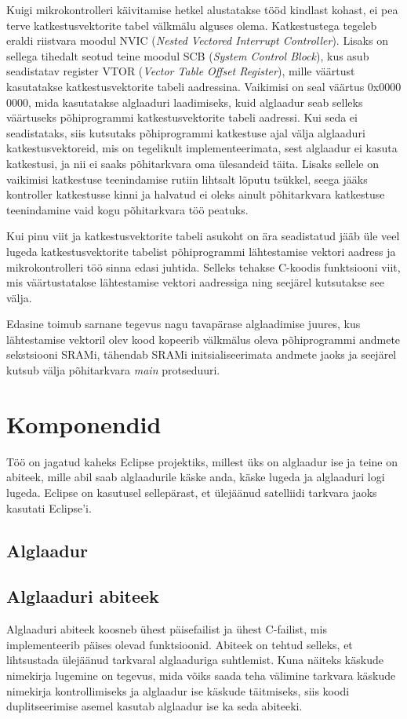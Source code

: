 \documentclass[12pt,a4paper]{article}
\begin{document}
Kuigi mikrokontrolleri käivitamise hetkel alustatakse tööd kindlast kohast, ei
pea terve katkestusvektorite tabel välkmälu alguses olema. Katkestustega tegeleb
eraldi riistvara moodul NVIC (\textit{Nested Vectored Interrupt Controller}).
Lisaks on sellega tihedalt seotud teine moodul SCB (\textit{System Control
Block}), kus asub seadistatav register VTOR (\textit{Vector Table Offset
Register}), mille väärtust kasutatakse katkestusvektorite tabeli aadressina.
\cite[ptk~4.4]{CM3pm} Vaikimisi on seal väärtus 0x0000 0000, mida kasutatakse alglaaduri
laadimiseks, kuid alglaadur seab selleks väärtuseks põhiprogrammi
katkestusvektorite tabeli aadressi. Kui seda ei seadistataks, siis kutsutaks
põhiprogrammi katkestuse ajal välja alglaaduri katkestusvektoreid, mis on
tegelikult implementeerimata, sest alglaadur ei kasuta katkestusi, ja nii ei
saaks põhitarkvara oma ülesandeid täita. Lisaks sellele on vaikimisi katkestuse
teenindamise rutiin lihtsalt lõputu tsükkel, seega jääks kontroller katkestusse
kinni ja halvatud ei oleks ainult põhitarkvara katkestuse teenindamine vaid kogu
põhitarkvara töö peatuks.

Kui pinu viit ja katkestusvektorite tabeli asukoht on ära seadistatud jääb üle
veel lugeda katkestusvektorite tabelist põhiprogrammi lähtestamise vektori
aadress ja mikrokontrolleri töö sinna edasi juhtida. Selleks tehakse C-koodis
funktsiooni viit, mis väärtustatakse lähtestamise vektori aadressiga ning
seejärel kutsutakse see välja.

Edasine toimub sarnane tegevus nagu tavapärase alglaadimise juures, kus
lähtestamise vektoril olev kood kopeerib välkmälus oleva põhiprogrammi andmete
sekstsiooni SRAMi, tähendab SRAMi initsialiseerimata andmete jaoks ja seejärel
kutsub välja põhitarkvara \textit{main} protseduuri.


\section{Komponendid}
Töö on jagatud kaheks Eclipse projektiks, millest üks on alglaadur ise ja teine on
abiteek, mille abil saab alglaadurile käske anda, käske lugeda ja alglaaduri
logi lugeda. Eclipse on kasutusel sellepärast, et ülejäänud satelliidi tarkvara jaoks
kasutati Eclipse'i. 

\subsection{Alglaadur}

\subsection{Alglaaduri abiteek}
Alglaaduri abiteek koosneb ühest päisefailist ja ühest C-failist, mis
implementeerib päises olevad funktsioonid. Abiteek on tehtud selleks, et
lihtsustada ülejäänud tarkvaral alglaaduriga suhtlemist. Kuna näiteks käskude
nimekirja lugemine on tegevus, mida võiks saada teha välimine tarkvara käskude
nimekirja kontrollimiseks ja alglaadur ise käskude täitmiseks, siis koodi
duplitseerimise asemel kasutab alglaadur ise ka seda abiteeki.
\end{document}

